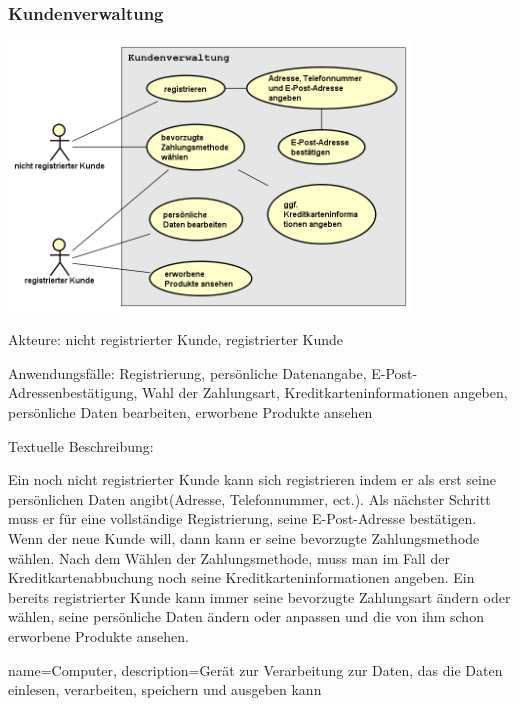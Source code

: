\documentclass[parskip=full]{scrartcl}
\begin{document}
\subsubsection{\gls{Kunde}nverwaltung}
\begin{center}
\includegraphics[width=0.8\textwidth]{szenario_kundenverwaltung.png}
\end{center}

Akteure: nicht registrierter \gls{Kunde}, registrierter \gls{Kunde}

Anwendungsfälle: Registrierung, persönliche Datenangabe, E-Post-Adressenbestätigung, Wahl der Zahlungsart, Kreditkarteninformationen angeben, persönliche Daten bearbeiten, erworbene Produkte ansehen 

Textuelle Beschreibung:

Ein noch nicht registrierter \gls{Kunde} kann sich registrieren indem er als erst seine persönlichen Daten angibt(Adresse, Telefonnummer, ect.). Als nächster Schritt muss er für eine vollständige Registrierung, seine E-Post-Adresse bestätigen. Wenn der neue \gls{Kunde} will, dann kann er seine bevorzugte Zahlungsmethode wählen. Nach dem Wählen der Zahlungsmethode, muss man im Fall der Kreditkartenabbuchung noch seine Kreditkarteninformationen angeben.
Ein bereits registrierter \gls{Kunde} kann immer seine bevorzugte Zahlungsart ändern oder wählen, seine persönliche Daten ändern oder anpassen und die von ihm schon erworbene Produkte ansehen. 


%
%
\printglossaries

%
%
{
  name=Computer,
  description={Gerät zur Verarbeitung zur Daten, das die Daten einlesen, verarbeiten, speichern und ausgeben kann}
}
\end{document}
